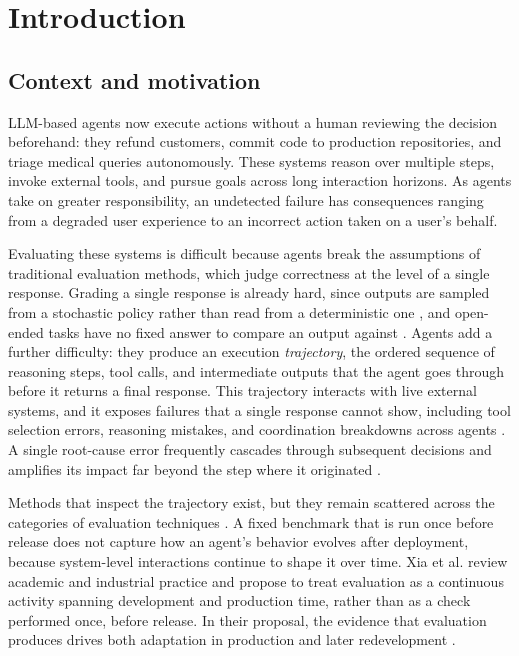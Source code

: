 \chapter{Introduction}
\label{chap:introduction}

\section{Context and motivation}

LLM-based agents now execute actions without a human reviewing the decision beforehand: they refund customers, commit code to production repositories, and triage medical queries autonomously. These systems reason over multiple steps, invoke external tools, and pursue goals across long interaction horizons. As agents take on greater responsibility, an undetected failure has consequences ranging from a degraded user experience to an incorrect action taken on a user's behalf.

Evaluating these systems is difficult because agents break the assumptions of traditional evaluation methods, which judge correctness at the level of a single response. Grading a single response is already hard, since outputs are sampled from a stochastic policy rather than read from a deterministic one \cite{songGoodBadGreedy2024}, and open-ended tasks have no fixed answer to compare an output against \cite{liuGEvalNLGEvaluation2023}. Agents add a further difficulty: they produce an execution \emph{trajectory}, the ordered sequence of reasoning steps, tool calls, and intermediate outputs that the agent goes through before it returns a final response. This trajectory interacts with live external systems, and it exposes failures that a single response cannot show, including tool selection errors, reasoning mistakes, and coordination breakdowns across agents \cite{maDemystifyingLifecycleFailures2026, mohammadiEvaluationBenchmarkingLLM2025}. A single root-cause error frequently cascades through subsequent decisions and amplifies its impact far beyond the step where it originated \cite{zhuWhereLLMAgents2025}.

Methods that inspect the trajectory exist, but they remain scattered across the categories of evaluation techniques \cite{mohammadiEvaluationBenchmarkingLLM2025}. A fixed benchmark that is run once before release does not capture how an agent's behavior evolves after deployment, because system-level interactions continue to shape it over time. Xia et al. review academic and industrial practice and propose to treat evaluation as a continuous activity spanning development and production time, rather than as a check performed once, before release. In their proposal, the evidence that evaluation produces drives both adaptation in production and later redevelopment \cite{xiaEvaluationDrivenDevelopmentOperations2025}.

